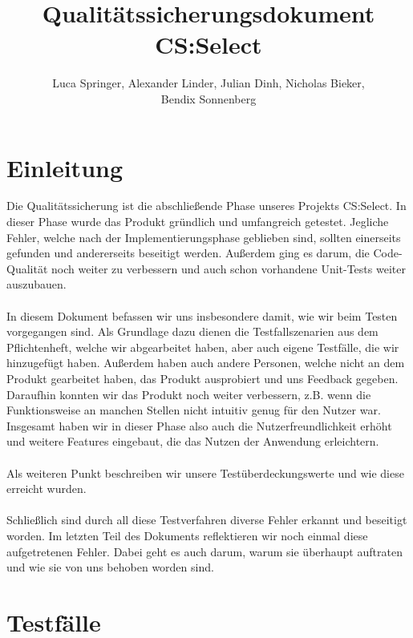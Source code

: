 \documentclass[a4paper]{scrreprt}
\begin{document}
    \title{Qualitätssicherungsdokument CS:Select}
    \author{Luca Springer, Alexander Linder, Julian Dinh, Nicholas Bieker,\\ Bendix Sonnenberg}
    \maketitle

    \tableofcontents
    \chapter{Einleitung}
    Die Qualitätssicherung ist die abschließende Phase unseres Projekts CS:Select. In dieser Phase wurde das Produkt
    gründlich und umfangreich getestet. Jegliche Fehler, welche nach der Implementierungsphase geblieben sind, sollten einerseits
    gefunden und andererseits beseitigt werden. Außerdem ging es darum,
    die Code-Qualität noch weiter zu verbessern und auch schon vorhandene Unit-Tests weiter auszubauen. \\
    \\
    In diesem Dokument befassen wir uns insbesondere damit, wie wir beim Testen vorgegangen sind. Als Grundlage dazu
    dienen die Testfallszenarien aus dem Pflichtenheft, welche wir abgearbeitet haben, aber auch eigene Testfälle, die wir hinzugefügt haben. Außerdem
    haben auch andere Personen, welche nicht an dem Produkt gearbeitet haben, das Produkt ausprobiert und uns Feedback gegeben. Daraufhin
    konnten wir das Produkt noch weiter verbessern, z.B. wenn die Funktionsweise an manchen Stellen nicht intuitiv genug für den Nutzer war.
    Insgesamt haben wir in dieser Phase also auch die Nutzerfreundlichkeit erhöht und weitere Features eingebaut, die das Nutzen der Anwendung erleichtern. \\
    \\
    Als weiteren Punkt beschreiben wir unsere Testüberdeckungswerte und wie diese erreicht wurden. \\
    \\
    Schließlich sind durch all diese Testverfahren diverse Fehler erkannt und beseitigt worden. Im letzten Teil des Dokuments
    reflektieren wir noch einmal diese aufgetretenen Fehler. Dabei geht es auch darum, warum sie überhaupt auftraten
    und wie sie von uns behoben worden sind.





    \chapter{Testfälle}
\end{document}
